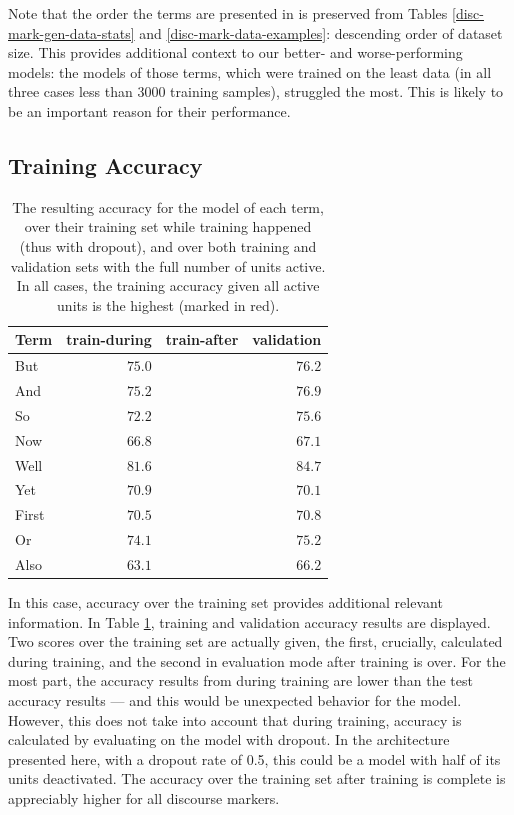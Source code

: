 Note that the order the terms are presented in is preserved from Tables \ref{disc-mark-gen-data-stats} and \ref{disc-mark-data-examples}: descending order of dataset size. This provides additional context to our better- and worse-performing models: the models of those terms, which were trained on the least data (in all three cases less than 3000 training samples), struggled the most. This is likely to be an important reason for their performance.

\subsection{Training Accuracy}

\begin{table}[h]
\centering
 \begin{tabular}{|| l | r | r | r ||}
 \hline
 Term & train-during & train-after & validation \\ [0.3ex] 
 \hline\hline
 But & $75.0$ & \color{red}{$77.1$} & $76.2$ \\
 \hline
 And & $75.2$ & \color{red}{$78.9$} & $76.9$ \\
 \hline
 So & $72.2$ & \color{red}{$77.4$} & $75.6$ \\
 \hline
 Now & $66.8$ & \color{red}{$72.4$} & $67.1$ \\
 \hline
 Well & $81.6$ & \color{red}{$85.5$} & $84.7$ \\
 \hline
 Yet & $70.9$ & \color{red}{$74.6$} & $70.1$ \\
 \hline
 First & $70.5$ & \color{red}{$72.6$} & $70.8$ \\
 \hline
 Or & $74.1$ & \color{red}{$78.0$} & $75.2$ \\
 \hline
 Also & $63.1$ & \color{red}{$69.5$} & $66.2$ \\
 \hline
\end{tabular}
\caption{The resulting accuracy for the model of each term, over their training set while training happened (thus with dropout), and over both training and validation sets with the full number of units active. In all cases, the training accuracy given all active units is the highest (marked in red).}
\label{disc-mark-train-acc}
\end{table}

In this case, accuracy over the training set provides additional relevant information. In Table \ref{disc-mark-train-acc}, training and validation accuracy results are displayed. Two scores over the training set are actually given, the first, crucially, calculated during training, and the second in evaluation mode after training is over. For the most part, the accuracy results from during training are lower than the test accuracy results --- and this would be unexpected behavior for the model. However, this does not take into account that during training, accuracy is calculated by evaluating on the model with dropout. In the architecture presented here, with a dropout rate of 0.5, this could be a model with half of its units deactivated. The accuracy over the training set after training is complete is appreciably higher for all discourse markers. 

